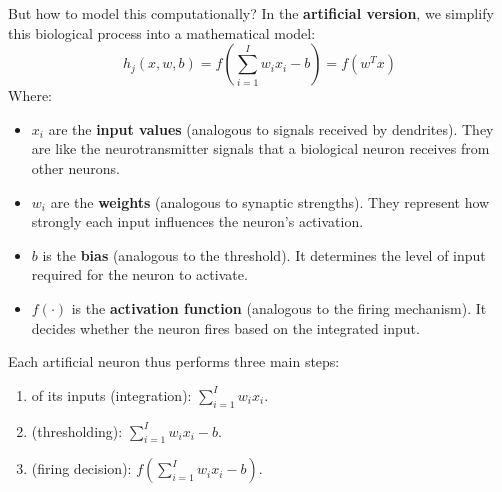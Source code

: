 \noindent
\textcolor{Red2}{} But how to model this computationally? In the \textbf{artificial version}, we simplify this biological process into a mathematical model:
\begin{equation*}
    h_{j}\left(x, w, b\right) = f\left(\sum_{i=1}^{I} w_{i} x_{i} - b\right) = f\left(w^{T} x\right)
\end{equation*}
Where:
\begin{itemize}
    \item $x_{i}$ are the \textbf{input values} (analogous to signals received by dendrites). They are like the neurotransmitter signals that a biological neuron receives from other neurons.
    \item $w_{i}$ are the \textbf{weights} (analogous to synaptic strengths). They represent how strongly each input influences the neuron's activation.
    \item $b$ is the \textbf{bias} (analogous to the threshold). It determines the level of input required for the neuron to activate.
    \item $f\left(\cdot\right)$ is the \textbf{activation function} (analogous to the firing mechanism). It decides whether the neuron fires based on the integrated input.
\end{itemize}
Each artificial neuron thus performs three main steps:
\begin{enumerate}
    \item {} of its inputs (integration): $\displaystyle\sum_{i=1}^{I} w_{i} x_{i}$.
    \item {} (thresholding): $\displaystyle\sum_{i=1}^{I} w_{i} x_{i} - b$.
    \item {} (firing decision): $f\left(\displaystyle\sum_{i=1}^{I} w_{i} x_{i} - b\right)$.
\end{enumerate}

